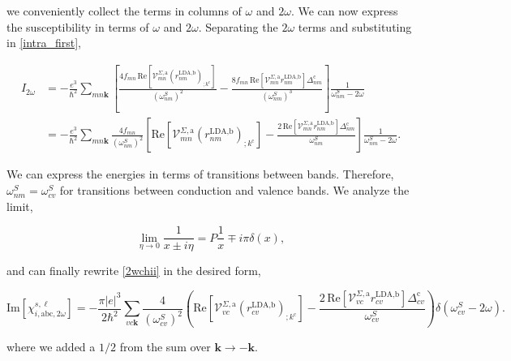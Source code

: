 we conveniently collect the terms in columns of $\omega$ and $2\omega$. We can now express the susceptibility in terms of $\omega$ and $2\omega$. Separating the $2\omega$ terms and substituting in \eqref{intra_first}, %

\begin{align}\label{2wchii}
I_{2\omega}
&= -\frac{e^{3}}{\hbar^2}\sum_{mn\mathbf{k}}\left[\frac{4f_{mn}\,\mathrm{Re}\left[\mathcal{V}^{\Sigma,\text{a}}_{mn}\left(r^{\text{LDA,b}}_{nm}\right)_{;k^{\text{c}}}\right]}{(\omega^{S}_{nm})^{2}} - \frac{8f_{mn}\,\mathrm{Re}\left[\mathcal{V}^{\Sigma,\text{a}}_{mn}r^{\text{LDA,b}}_{nm}\right]\Delta^{\text{c}}_{nm}}{(\omega^{S}_{nm})^{3}}\right]\frac{1}{\omega^{S}_{nm}-2\omega}\nonumber\\
&= -\frac{e^3}{\hbar^2}\sum_{mn\mathbf{k}}\frac{4f_{mn}}{(\omega^{S}_{nm})^{2}}\left[\mathrm{Re}\left[\mathcal{V}^{\Sigma,\text{a}}_{mn}\left(r^{\text{LDA,b}}_{nm}\right)_{;k^{\text{c}}}\right] - \frac{2\,\mathrm{Re}\left[\mathcal{V}^{\Sigma,\text{a}}_{mn}r^{\text{LDA,b}}_{nm}\right]\Delta^{\text{c}}_{nm}}{\omega^{S}_{nm}}\right]\frac{1}{\omega^{S}_{nm}-2\omega}.
\end{align}

We can express the energies in terms of transitions between bands. Therefore, $\omega^{S}_{nm} = \omega^{S}_{cv}$ for transitions between conduction and valence bands. We analyze the limit,

\begin{equation}\label{limit_eta}
\lim_{\eta\to 0}\frac{1}{x\pm i\eta}=P\frac{1}{x}\mp i\pi\delta(x),
\end{equation}

and can finally rewrite \eqref{2wchii} in the desired form,

\begin{equation}\label{imchi2w}
\mathrm{Im}[\chi_{i,\text{a}\text{b}\text{c},2\omega}^{s,\ell}] = -\frac{\pi \vert e\vert^{3}}{2\hbar^2}\sum_{vc\mathbf{k}}\frac{4}{(\omega^{S}_{cv})^{2}}\left(\mathrm{Re}\left[\mathcal{V}^{\Sigma,\text{a}}_{vc}\left(r^{\text{LDA,b}}_{cv}\right)_{;k^{\text{c}}}\right] - \frac{2\,\mathrm{Re}\left[\mathcal{V}^{\Sigma,\text{a}}_{vc}r^{\text{LDA,b}}_{cv}\right]\Delta^{\text{c}}_{cv}}{\omega^{S}_{cv}}\right)\delta(\omega^{S}_{cv}-2\omega).
\end{equation}

where we added a $1/2$ from the sum over $\mathbf{k} \rightarrow - \mathbf{k}$.

